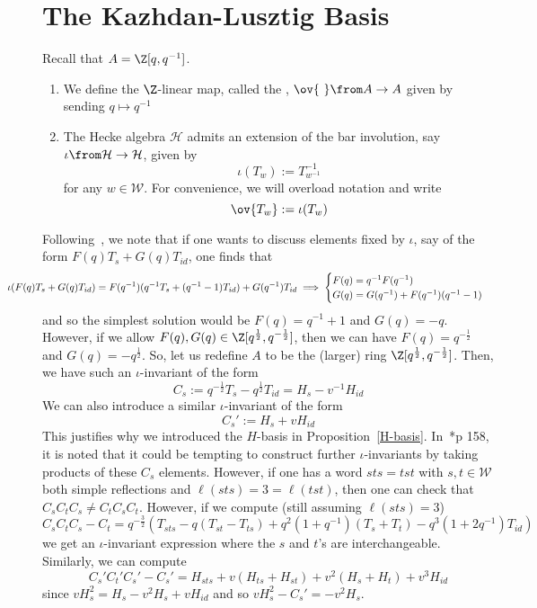 \documentclass[11pt,leqno,oneside]{amsart}
\numberwithin{thm}{section}
\renewcommand{\W}{\mathcal{W}}
\renewcommand{\H}{\mathcal{H}} %
\begin{document}
\section{The Kazhdan-Lusztig Basis}
\begin{defn}
  Recall that \(A = \Z[q,q^{-1}]\).
  \begin{enumerate}
  \item We define the \(\Z\)-linear map, called the , \(\ov{\ } \from A \to A\)
    given by sending \(q \mapsto q^{-1}\)
  \item   The Hecke algebra \(\H\) admits an extension of the bar
    involution, say \(\iota \from \H
  \to \H\), given by \[
    \iota(T_w) := T_{w^{-1}}^{-1}
  \]
  for any \(w \in \W\). For convenience, we will overload notation and
  write \[
    \ov{T_w} := \iota(T_w)
  \]
  \end{enumerate}
\end{defn}
Following~\cite{williamson}, we note that if one wants to discuss elements fixed by \(\iota\), say of the form
\(F(q)T_s + G(q)T_{id}\), one finds that \[
   \hspace{-0.5in}\iota(F(q)T_s + G(q)T_{id}) = F(q^{-1})(q^{-1}T_s+(q^{-1}-1)T_{id})
   + G(q^{-1})T_{id} \implies
   \begin{cases}
     F(q) = q^{-1}F(q^{-1}) \\
     G(q) = G(q^{-1})+F(q^{-1})(q^{-1}-1)
   \end{cases}
 \]
 and so the simplest solution would be \(F(q) = q^{-1}+1\) and
 \(G(q)=-q\). However, if we allow \(F(q),G(q) \in \Z[q^{\frac{1}{2}},
 q^{-\frac{1}{2}}]\), then we can have \(F(q) = q^{-\frac{1}{2}}\) and \(G(q) =
 -q^{\frac{1}{2}}\). So, let us redefine \(A\) to be the (larger) ring
 \(\Z[q^{\frac{1}{2}},q^{-\frac{1}{2}}]\). Then, we have such an \(\iota\)-invariant
 of the form \[
   C_s := q^{-\frac{1}{2}} T_s - q^{\frac{1}{2}} T_{id} = H_s-v^{-1} H_{id}
 \]
 We can also introduce a similar \(\iota\)-invariant of the form \[
   C_s' := H_s+v H_{id}
 \]
 This justifies why we introduced the \(H\)-basis in
 Proposition~\ref{H-basis}. 
 In~\cite{humphreys}*{p 158}, it is noted that it could be tempting to
 construct further \(\iota\)-invariants by taking products of these
 \(C_s\) elements. However, if one has a word \(sts = tst\) with \(s,t
 \in \W\) both simple reflections and \(\ell(sts) = 3 = \ell(tst)\),
 then one can check that \(C_s C_t C_s \neq C_t C_s C_t\). However, if
 we compute (still assuming \(\ell(sts) = 3\)) \[
   C_s C_t C_s - C_t = q^{-\frac{3}{2}}(T_{sts}-q(T_{st}-T_{ts})+q^2(1+q^{-1})(T_s+T_t)-q^3(1+2q^{-1})T_{id})
 \]
 we get an \(\iota\)-invariant expression where the \(s\) and \(t\)'s
 are interchangeable. Similarly, we can compute \[
   C_s' C_t' C_s' - C_s' = H_{sts} + v(H_{ts}+H_{st})+v^2(H_s+H_t) + v^3
   H_{id}
 \]
 since \(vH_s^2 = H_s-v^2H_s+vH_{id}\) and so \(vH_s^2 - C_s' = -v^2 H_s\).
 
\end{document}
